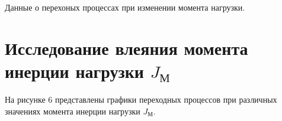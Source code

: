\documentclass[a4paper, 12pt]{article}
\begin{document}
\begin{table}[h!]
    \centering
    \begin{threeparttable}
        \caption{Данные о перехоных процессах при изменении момента нагрузки.}
    \end{threeparttable}
\end{table}

\newpage
\section{Исследование влеяния момента инерции нагрузки $J_\text{М}$}
На рисунке 6 представлены графики переходных процессов при различных значениях момента инерции нагрузки $J_\text{М}$.
\end{document}

